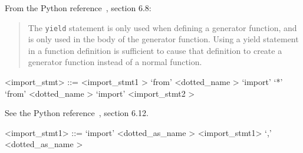 From the Python reference~\cite{pythonlang}, section 6.8:
\begin{quote}
The \verb|yield| statement is only used when defining a generator function, 
and is only used in the body of the generator function. Using a yield 
statement in a function definition is sufficient to cause that definition 
to create a generator function instead of a normal function.
\end{quote}

\label{importzzzstmtb}

\begin{grammar}
<import_stmt> ::= <import_stmt1 \myref[importzzzstmt1b]>
	\alt `from' <dotted_name \myref[dottedzzznameb]> `import' `*'
	\alt `from' <dotted_name \myref[dottedzzznameb]> `import' <import_stmt2 \myref[importzzzstmt2b]>
\end{grammar}


See the Python reference~\cite{pythonlang}, section 6.12.

\label{importzzzstmt1b}

\begin{grammar}
<import_stmt1> ::= `import' <dotted_as_name \myref[dottedzzzaszzznameb]>
	\alt <import_stmt1> `,' <dotted_as_name \myref[dottedzzzaszzznameb]>
\end{grammar}


